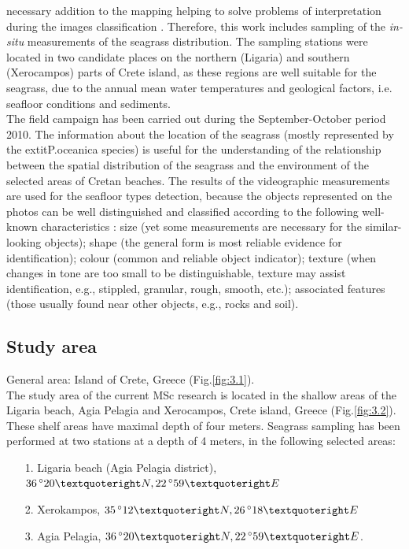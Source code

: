 \documentclass[10pt, a4paper]{article}
\begin{document}
necessary addition to the mapping helping to solve problems of interpretation during the images
classification \cite{Pasqualini98a}\label{Pasqualini98a}. Therefore, this work includes sampling of the \textit{in-situ}
measurements of the seagrass distribution.
The sampling stations were located in two candidate places on the northern (Ligaria) and southern
(Xerocampos) parts of Crete island, as these regions are well suitable for the seagrass, due to the
annual mean water temperatures and geological factors, i.e. seafloor conditions and sediments. \\ The
field campaign has been carried out during the September-October period 2010. 
The information about the location of the seagrass (mostly represented by the 	extit{P.oceanica} species) is useful for the
understanding of the relationship between the spatial distribution of the seagrass and the environment
of the selected areas of Cretan beaches. The results of the videographic measurements are used for the
seafloor types detection, because the objects represented on the photos can be well distinguished and
classified according to the following well-known characteristics \cite{Butler87}\label{Butler87}: size (yet some
measurements are necessary for the similar-looking objects); shape (the general form is most reliable
evidence for identification); colour (common and reliable object indicator); texture (when changes in
tone are too small to be distinguishable, texture may assist identification, e.g., stippled, granular,
rough, smooth, etc.); associated features (those usually found near other objects, e.g., rocks and soil).

\subsection{Study area}
General area: Island of Crete, Greece (Fig.\ref{fig:3.1}).\\
The study area of the current MSc research is located in the shallow areas of the Ligaria beach, Agia
Pelagia and Xerocampos, Crete island, Greece (Fig.\ref{fig:3.2}). These shelf areas have maximal depth of four meters.
Seagrass sampling has been performed at two stations at a depth of 4 meters, in the following selected
areas:
\begin{itemize}
	\item [1.] Ligaria beach (Agia Pelagia district), $36\,^{\circ}20\textquoteright N, 22\,^{\circ}59\textquoteright E$ 
	\item [2.] Xerokampos, $35\,^{\circ}12\textquoteright N, 26\,^{\circ}18\textquoteright E$
	\item [3.] Agia Pelagia, $36\,^{\circ}20\textquoteright N, 22\,^{\circ}59\textquoteright E$.
\end{itemize}
\end{document}
